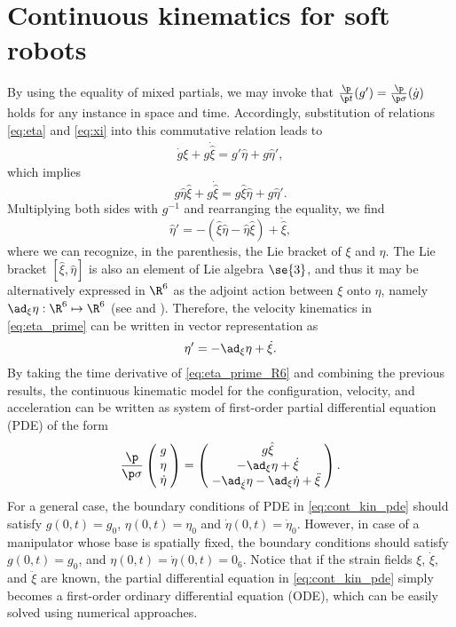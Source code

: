 \section*{Continuous kinematics for soft robots}
By using the equality of mixed partials, we may invoke that $\frac{\p}{\p t} (g') = \frac{\p }{\p \sigma} (\dot{g})$ holds for any instance in space and time. Accordingly, substitution of relations \eqref{eq:eta} and \eqref{eq:xi} into this commutative relation leads to
\begin{align}
\dot{g}\xi + g\dot{\hat{\xi}}  = g'\hat{\eta} + g\hat{\eta}',
\end{align}
which implies
\begin{equation}
g\hat{\eta} \hat{\xi} + g\dot{\hat{\xi}}  = g\hat{\xi}\hat{\eta} + g\hat{\eta}'.
\end{equation}
Multiplying both sides with $g^{-1}$ and rearranging the equality, we find
\begin{equation}
\hat{\eta}' = -(\hat{\xi}\hat{\eta} - \hat{\eta} \hat{\xi}) + \dot{\hat{\xi}},\label{eq:eta_prime}
\end{equation}
where we can recognize, in the parenthesis, the Lie bracket of $\xi$ and $\eta$. The Lie bracket $[\hat{\xi},\hat{\eta}]$ is also an element of Lie algebra $\se{3}$, and thus it may be alternatively expressed in $\R^6$ as the adjoint action between $\xi$ onto $\eta$, namely $\ad_{\xi} \eta: \R^6 \mapsto \R^6$ (see \cite{Spong2006} and \cite{Traversaro2016}). Therefore, the velocity kinematics in \eqref{eq:eta_prime} can be written in vector representation as
\begin{equation}
\eta' = -\ad_\xi \eta + \dot{\xi}.
\label{eq:eta_prime_R6}
\end{equation}
By taking the time derivative of \eqref{eq:eta_prime_R6} and combining the previous results, the continuous kinematic model for the configuration, velocity, and acceleration can be written as system of first-order partial differential equation (PDE) of the form
\begin{equation}
\frac{\p}{\p \sigma}\begin{pmatrix}\; g \;\\  \; \eta \; \\ \; \dot{\eta} \; \end{pmatrix} = \begin{pmatrix} \; g \hat{\xi} \\ \; -\ad_\xi \eta + \dot{\xi} \\ \; -\ad_{\dot{\xi}} \eta - \ad_{{\xi}} \dot{\eta} + \ddot{\xi} \;\end{pmatrix}.
\label{eq:cont_kin_pde}
\end{equation}
For a general case, the boundary conditions of PDE in \eqref{eq:cont_kin_pde} should satisfy $g(0,t) = g_0$, $\eta(0,t) = \eta_0$ and $\dot{\eta}(0,t) = \dot{\eta}_0$. However, in case of a manipulator whose base is spatially fixed, the boundary conditions should satisfy $g(0,t) = g_0$, and $\eta(0,t) = \dot{\eta}(0,t) = 0_6$. Notice that if the strain fields $\xi$, $\dot{\xi}$, and $\ddot{\xi}$ are known, the partial differential equation in \eqref{eq:cont_kin_pde} simply becomes a first-order ordinary differential equation (ODE), which can be easily solved using numerical approaches.